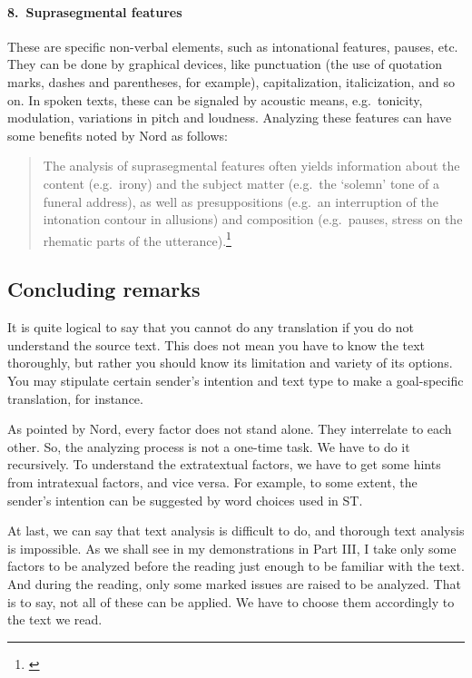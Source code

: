 \paragraph*{8.\ Suprasegmental features}\label{par:suprasegment} These are specific non-verbal elements, such as intonational features, pauses, etc. They can be done by graphical devices, like punctuation (the use of quotation marks, dashes and parentheses, for example), capitalization, italicization, and so on. In spoken texts, these can be signaled by acoustic means, e.g.\ tonicity, modulation, variations in pitch and loudness. Analyzing these features can have some benefits noted by Nord as follows:

\begin{quote}
The analysis of suprasegmental features often yields information about the content (e.g.\ irony) and the subject matter (e.g.\ the `solemn' tone of a funeral address), as well as presuppositions (e.g.\ an interruption of the intonation contour in allusions) and composition (e.g.\ pauses, stress on the rhematic parts of the utterance).\footnote{\citealp[p.~137]{nord:analysis}}
\end{quote}

\subsection*{Concluding remarks}

It is quite logical to say that you cannot do any translation if you do not understand the source text. This does not mean you have to know the text thoroughly, but rather you should know its limitation and variety of its options. You may stipulate certain sender's intention and text type to make a goal-specific translation, for instance.

As pointed by Nord, every factor does not stand alone. They interrelate to each other. So, the analyzing process is not a one-time task. We have to do it recursively. To understand the extratextual factors, we have to get some hints from intratexual factors, and vice versa. For example, to some extent, the sender's intention can be suggested by word choices used in ST.

At last, we can say that text analysis is difficult to do, and thorough text analysis is impossible. As we shall see in my demonstrations in Part III, I take only some factors to be analyzed before the reading just enough to be familiar with the text. And during the reading, only some marked issues are raised to be analyzed. That is to say, not all of these can be applied. We have to choose them accordingly to the text we read.
